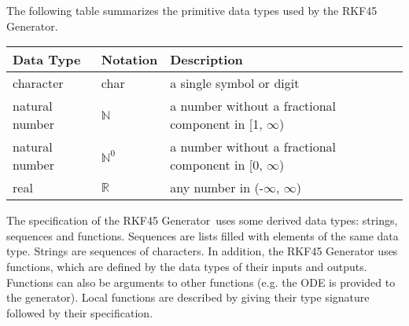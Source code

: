 \documentclass[12pt, titlepage]{article}
\newcommand{\progname}{the RKF45 Generator\xspace}
\begin{document}
The following table summarizes the primitive data types used by \progname. 

\begin{center}
  \renewcommand{\arraystretch}{1.2}
  \noindent 
  \begin{tabular}{l l p{7.5cm}} 
    \toprule 
    \textbf{Data Type} & \textbf{Notation} & \textbf{Description}\\ 
    \midrule
    character & char & a single symbol or digit\\
    natural number & $\mathbb{N}$ & a number without a fractional component in 
    [1, $\infty$) \\
    natural number & $\mathbb{N}^0$ & a number without a fractional component 
    in 
    [0, $\infty$) \\
    real & $\mathbb{R}$ & any number in (-$\infty$, $\infty$)\\
    \bottomrule
  \end{tabular} 
\end{center}


\noindent
The specification of \progname \ uses some derived data types: strings, 
sequences and functions. 
Sequences are lists filled with elements of the same data type.
Strings are sequences of characters. 
In addition, \progname uses functions, which are defined by the data types of 
their inputs and outputs. Functions can also be arguments to other functions 
(e.g. the ODE is provided to the generator). 
Local functions are described by giving their type signature followed by their 
specification.
\end{document}
